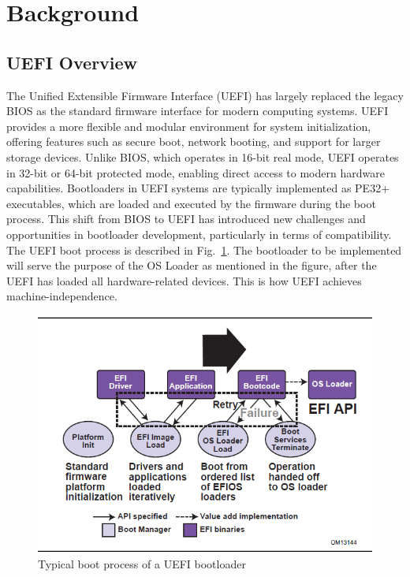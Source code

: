 \documentclass[conference]{IEEEtran}
\begin{document}
\section{Background}
\subsection{UEFI Overview}

The Unified Extensible Firmware Interface (UEFI) has largely replaced the legacy BIOS as the standard firmware interface for modern computing systems.
UEFI provides a more flexible and modular environment for system initialization, offering features such as secure boot, network booting, and support for larger storage devices.
Unlike BIOS, which operates in 16-bit real mode, UEFI operates in 32-bit or 64-bit protected mode, enabling direct access to modern hardware capabilities.
Bootloaders in UEFI systems are typically implemented as PE32+ executables, which are loaded and executed by the firmware during the boot process. This shift from BIOS to UEFI has introduced new challenges and opportunities in bootloader development, particularly in terms of compatibility. The UEFI boot process is described in Fig.~\ref{uefiboot}. The bootloader to be implemented will serve the purpose of the OS Loader as mentioned in the figure, after the UEFI has loaded all hardware-related devices. This is how UEFI achieves machine-independence.

\begin{figure}[!t]
    \centering
    \includegraphics[width=0.9\columnwidth]{uefibootprocess.png}
    \caption{Typical boot process of a UEFI bootloader}
    \label{uefiboot}
\end{figure}
\end{document}

